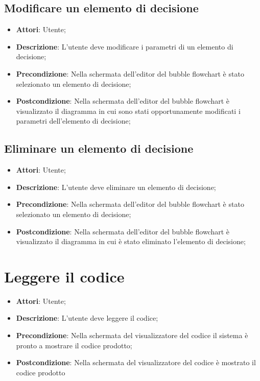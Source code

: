\documentclass[../AnalisiDeiRequisiti.tex]{subfiles}
\begin{document}
	\subsection{Modificare un elemento di decisione}
	\begin{itemize}
		\item \textbf{Attori}: Utente;
		\item \textbf{Descrizione}: L'utente deve modificare i parametri di un elemento di decisione;
		\item \textbf{Precondizione}: Nella schermata dell'editor del bubble flowchart è stato selezionato un elemento di decisione;
		\item \textbf{Postcondizione}: Nella schermata dell'editor del bubble flowchart è visualizzato il diagramma in cui sono stati opportunamente modificati i parametri dell'elemento di decisione;
	\end{itemize}
	
	\subsection{Eliminare un elemento di decisione}
	\begin{itemize}
		\item \textbf{Attori}: Utente;
		\item \textbf{Descrizione}: L'utente deve eliminare un elemento di decisione;
		\item \textbf{Precondizione}: Nella schermata dell'editor del bubble flowchart è stato selezionato un elemento di decisione;
		\item \textbf{Postcondizione}: Nella schermata dell'editor del bubble flowchart è visualizzato il diagramma in cui è stato eliminato l'elemento di decisione;
	\end{itemize}
	
	
	\section{Leggere il codice}
	\begin{itemize}
		\item \textbf{Attori}: Utente;
		\item \textbf{Descrizione}: L'utente deve leggere il codice;
		\item \textbf{Precondizione}: Nella schermata del visualizzatore del codice il sistema è pronto a mostrare il codice prodotto;
		\item \textbf{Postcondizione}: Nella schermata del visualizzatore del codice è mostrato il codice prodotto
	\end{itemize}
	
\end{document}
